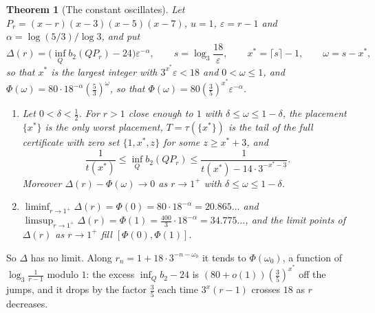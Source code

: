 \documentclass[11pt]{article}
\newtheorem{theorem}{Theorem}[section]
\begin{document}
\begin{theorem}[The constant oscillates]\label{thm:familyosc}
Let $P_r=(x-r)(x-3)(x-5)(x-7)$, $u=1$, $\varepsilon=r-1$ and
$\alpha=\log(5/3)/\log3$, and put
\[
  \Delta(r)=\bigl(\inf_Qb_2(QP_r)-24\bigr)\varepsilon^{-\alpha},\qquad
  s=\log_3\frac{18}\varepsilon,\qquad x^*=\lceil s\rceil-1,\qquad
  \omega=s-x^*,
\]
so that $x^*$ is the largest integer with $3^{x^*}\varepsilon<18$ and
$0<\omega\le1$, and $\Phi(\omega)=80\cdot18^{-\alpha}(\tfrac53)^\omega$, so
that $\Phi(\omega)=80(\tfrac35)^{x^*}\varepsilon^{-\alpha}$.
\begin{enumerate}
\item[(a)] Let $0<\delta<\tfrac12$.  For $r>1$ close enough to $1$ with
$\delta\le\omega\le1-\delta$, the placement $\{x^*\}$ is the only worst
placement, $T=\tau(\{x^*\})$ is the tail of the full certificate with zero
set $\{1,x^*,z\}$ for some $z\ge x^*+3$, and
\[
  \frac1{t(x^*)}\le\inf_Qb_2(QP_r)\le\frac1{t(x^*)-14\cdot3^{-x^*-3}} .
\]
Moreover $\Delta(r)-\Phi(\omega)\to0$ as $r\to1^+$ with
$\delta\le\omega\le1-\delta$.
\item[(b)] $\liminf_{r\to1^+}\Delta(r)=\Phi(0)=80\cdot18^{-\alpha}=20.865\ldots$
and $\limsup_{r\to1^+}\Delta(r)=\Phi(1)=\tfrac{400}3\cdot18^{-\alpha}=34.775\ldots$,
and the limit points of $\Delta(r)$ as $r\to1^+$ fill $[\Phi(0),\Phi(1)]$.
\end{enumerate}
\end{theorem}

So $\Delta$ has no limit.  Along $r_n=1+18\cdot3^{-n-\omega_0}$ it tends to
$\Phi(\omega_0)$, a function of $\log_3\frac1{r-1}$ modulo $1$: the excess
$\inf_Qb_2-24$ is $(80+o(1))(\tfrac35)^{x^*}$ off the jumps, and it drops
by the factor $\tfrac35$ each time $3^x(r-1)$ crosses $18$ as $r$ decreases.
\end{document}

